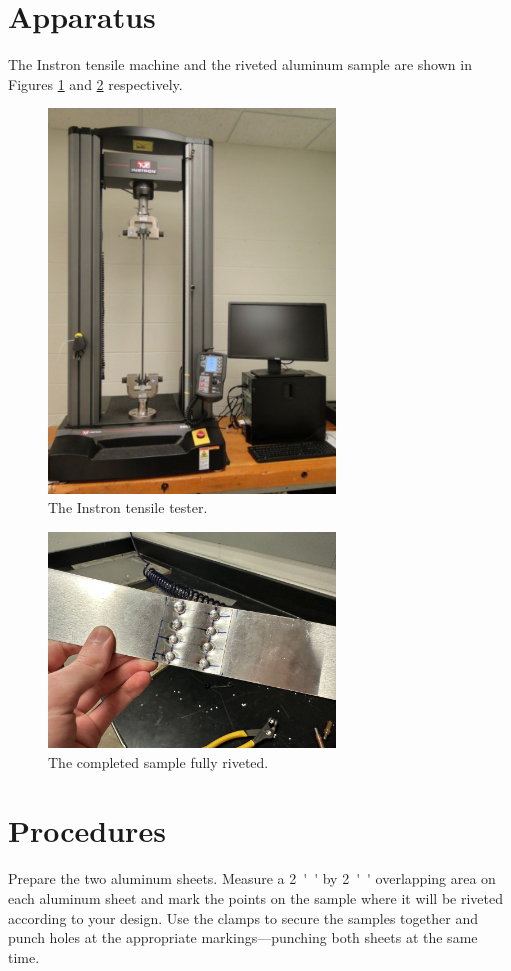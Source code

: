 \documentclass[12 pt]{article}
\begin{document}
\section{Apparatus} \label{apparatus}
The Instron tensile machine and the riveted aluminum sample are shown in Figures \ref{fig:instron} and \ref{fig:completed-sample} respectively.

\begin{figure}[htbp]
\centering
\includegraphics[width=3in]{images/instron}
\caption{The Instron tensile tester.}
\label{fig:instron}
\end{figure}

\begin{figure}[htbp]
\centering
\includegraphics[width=3in]{images/completed-sample}
\caption{The completed sample fully riveted.}
\label{fig:completed-sample}
\end{figure}

\section{Procedures} \label{procedures}
Prepare the two aluminum sheets. Measure a \qty{2}{''} by \qty{2}{''} overlapping area on each aluminum sheet and mark the points on the sample where it will be riveted according to your design. Use the clamps to secure the samples together and punch holes at the appropriate markings---punching both sheets at the same time.
\end{document}
